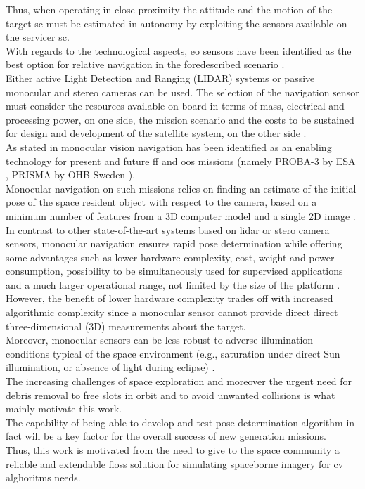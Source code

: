 Thus, when operating in close-proximity the attitude and the motion of the target \acrshort{sc} must be estimated in autonomy by exploiting the sensors available on the servicer \acrshort{sc}.\\
With regards to the technological aspects, \acrfull{eo} sensors have been identified as the best option for relative navigation in the foredescribed scenario \cite{Opromolla2017} \cite{pesciolino}.\\
Either active Light Detection and Ranging (LIDAR) systems or passive monocular and stereo cameras can be used. The selection of the navigation sensor must consider the resources available on board in terms of mass, electrical and processing power, on one side, the mission scenario and the costs to be sustained for design and development of the satellite system, on the other side \cite{clerc2012astrium} \cite{pesciolino}.\\
As stated in \cite{Sharma2016} monocular vision navigation has been identified as an enabling technology for present and future \acrshort{ff} and \acrshort{oos} missions (namely PROBA-3 by ESA \cite{Casti2019}, PRISMA by OHB Sweden \cite{2013Damico}).\\
Monocular navigation on such missions relies on finding an estimate of the initial pose of the space resident object with respect to the camera, based on a minimum number of features from a 3D computer model and a single 2D image \cite{Sharma2016}.\\
In contrast to other state-of-the-art systems based on \acrfull{lidar} or stero camera sensors, monocular navigation ensures rapid pose determination while offering some advantages such as lower hardware complexity, cost, weight and power consumption, possibility to be simultaneously used for supervised applications and a much larger operational range, not limited by the size of the platform \cite{Sharma2018} \cite{2016Ventura} \cite{pesciolino}.
However, the benefit of lower hardware complexity trades off with increased algorithmic complexity since a monocular sensor cannot provide direct
direct three-dimensional (3D) measurements about the target.\\
Moreover, monocular sensors can be less robust to adverse illumination conditions typical of the space environment \cite{Volpe2017} (e.g., saturation under direct Sun illumination, or absence of light during eclipse) \cite{pesciolino}.\\
The increasing challenges of space exploration and moreover the urgent need for debris removal to free slots in orbit and to avoid unwanted collisions is what mainly motivate this work.\\
The capability of being able to develop and test pose determination algorithm in fact will be a key factor for the overall success of new generation missions.\\
Thus, this work is motivated from the need to give to the space community a reliable and extendable \acrfull{floss} solution for simulating spaceborne imagery for \acrfull{cv} alghoritms needs.

